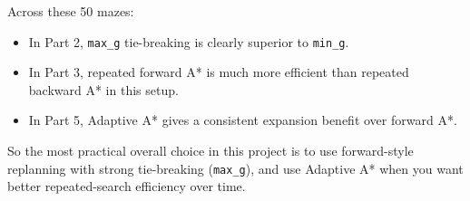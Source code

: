 \documentclass[11pt]{article}
\begin{document}
Across these 50 mazes:

\begin{itemize}[leftmargin=*]
\item In Part 2, \texttt{max\_g} tie-breaking is clearly superior to \texttt{min\_g}.
\item In Part 3, repeated forward A* is much more efficient than repeated backward A* in this setup.
\item In Part 5, Adaptive A* gives a consistent expansion benefit over forward A*.
\end{itemize}

So the most practical overall choice in this project is to use forward-style replanning with strong tie-breaking (\texttt{max\_g}), and use Adaptive A* when you want better repeated-search efficiency over time.
\end{document}
